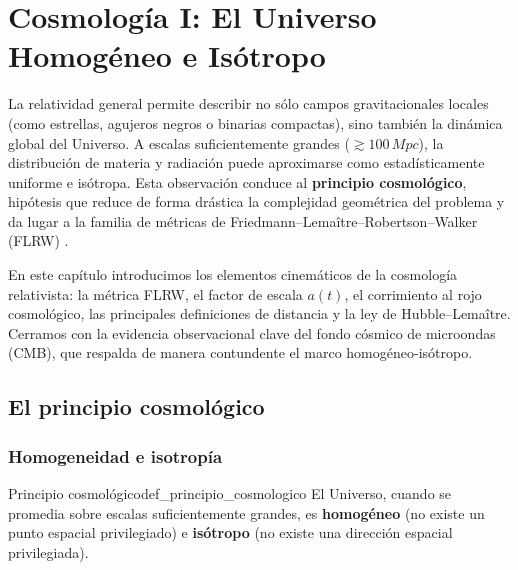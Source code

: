 
\chapter{Cosmología I: El Universo Homogéneo e Isótropo}
\label{cap:flrw_fundamentos}

La relatividad general permite describir no sólo campos gravitacionales locales (como estrellas, agujeros negros o binarias compactas), sino también la dinámica global del Universo. A escalas suficientemente grandes ($\gtrsim 100\,\si{Mpc}$), la distribución de materia y radiación puede aproximarse como estadísticamente uniforme e isótropa. Esta observación conduce al \textbf{principio cosmológico}, hipótesis que reduce de forma drástica la complejidad geométrica del problema y da lugar a la familia de métricas de Friedmann--Lemaître--Robertson--Walker (FLRW) \cite{Peebles1993, Weinberg2008, Ryden2017}.

En este capítulo introducimos los elementos cinemáticos de la cosmología relativista: la métrica FLRW, el factor de escala $a(t)$, el corrimiento al rojo cosmológico, las principales definiciones de distancia y la ley de Hubble--Lemaître. Cerramos con la evidencia observacional clave del fondo cósmico de microondas (CMB), que respalda de manera contundente el marco homogéneo-isótropo.

\section{El principio cosmológico}
\label{sec:principio_cosmologico}

\subsection{Homogeneidad e isotropía}

\begin{definicion}{Principio cosmológico}{def_principio_cosmologico}
El Universo, cuando se promedia sobre escalas suficientemente grandes, es \textbf{homogéneo} (no existe un punto espacial privilegiado) e \textbf{isótropo} (no existe una dirección espacial privilegiada).
\end{definicion}

